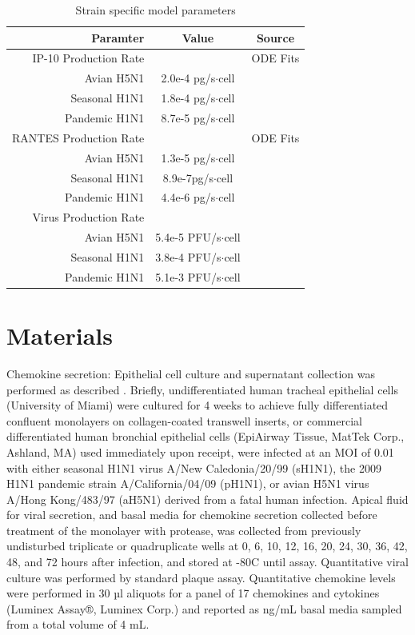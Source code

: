\documentclass[10pt]{article}
\begin{document}
\begin{table}
\begin{center}
\begin{tabular}{ | r | c | c | }
  \hline                        
  Paramter & Value & Source \\
  \hline
  IP-10 Production Rate &  & ODE Fits \\
  Avian H5N1 & 2.0e-4 pg/s$\cdot$cell & \\
  Seasonal H1N1 & 1.8e-4 pg/s$\cdot$cell& \\
  Pandemic H1N1 & 8.7e-5 pg/s$\cdot$cell& \\
  \hline
  RANTES Production Rate & & ODE Fits \\
  Avian H5N1 & 1.3e-5 pg/s$\cdot$cell& \\
  Seasonal H1N1 & 8.9e-7pg/s$\cdot$cell& \\
  Pandemic H1N1 & 4.4e-6 pg/s$\cdot$cell& \\
  \hline
  Virus Production Rate &  & \cite{Mitchell2011} \\
  Avian H5N1 & 5.4e-5 PFU/s$\cdot$cell& \\
  Seasonal H1N1 & 3.8e-4 PFU/s$\cdot$cell& \\
  Pandemic H1N1 & 5.1e-3 PFU/s$\cdot$cell& \\  
  \hline  
\end{tabular}
\caption{Strain specific model parameters}
\label{table:strains}
\end{center}
\end{table}

\section*{Materials}

Chemokine secretion:  Epithelial cell culture and supernatant collection was performed as described \cite{Mitchell2011}.  Briefly, undifferentiated human tracheal epithelial cells (University of Miami) were cultured for 4 weeks to achieve fully differentiated confluent monolayers on collagen-coated transwell inserts, or commercial differentiated human bronchial epithelial cells (EpiAirway Tissue, MatTek Corp., Ashland, MA) used immediately upon receipt, were infected at an MOI of 0.01 with either seasonal H1N1 virus A/New Caledonia/20/99 (sH1N1), the 2009 H1N1 pandemic strain A/California/04/09 (pH1N1), or avian H5N1 virus A/Hong Kong/483/97 (aH5N1) derived from a fatal human infection.  Apical fluid for viral secretion, and basal media for chemokine secretion collected before treatment of the monolayer with protease, was collected from previously undisturbed triplicate or quadruplicate wells at 0, 6, 10, 12, 16, 20, 24, 30, 36, 42, 48, and 72 hours after infection, and stored at -80C until assay.  Quantitative viral culture was performed by standard plaque assay.  Quantitative chemokine levels were performed in 30 µl aliquots for a panel of 17 chemokines and cytokines (Luminex Assay®, Luminex Corp.) and reported as ng/mL basal media sampled from a total volume of 4 mL.
\end{document}
